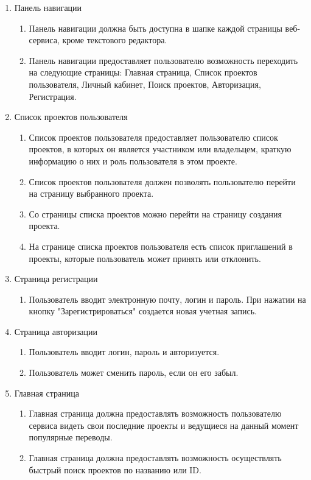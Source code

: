 \documentclass[a4paper,12pt]{article}
\begin{document}
\begin{enumerate}
\item Панель навигации
\begin{enumerate}
	\item Панель навигации должна быть доступна в шапке каждой страницы веб-сервиса, кроме текстового редактора.
	\item Панель навигации предоставляет пользователю возможность переходить на следующие страницы: Главная страница, Список проектов пользователя, Личный кабинет, Поиск проектов, Авторизация, Регистрация.
\end{enumerate}
\item Список проектов пользователя
\begin{enumerate}
	\item Список проектов пользователя предоставляет пользователю список проектов, в которых он является участником или владельцем, краткую информацию о них и роль пользователя в этом проекте.
	\item Список проектов пользователя должен позволять пользователю перейти на страницу выбранного проекта.
	\item Со страницы списка проектов можно перейти на страницу создания проекта.
	\item На странице списка проектов пользователя есть список приглашений в проекты, которые пользователь может принять или отклонить.
\end{enumerate}
\item Страница регистрации
\begin{enumerate}
	\item Пользователь вводит электронную почту, логин и пароль. При нажатии на кнопку "Зарегистрироваться" создается новая учетная запись.
\end{enumerate}
\item Страница авторизации
\begin{enumerate}
	\item Пользователь вводит логин, пароль и авторизуется.
	\item Пользователь может сменить пароль, если он его забыл.
\end{enumerate}
\item Главная страница
\begin{enumerate}
	\item Главная страница должна предоставлять возможность пользователю сервиса видеть свои последние проекты и ведущиеся на данный момент популярные переводы.
	\item Главная страница должна предоставлять возможность осуществлять быстрый поиск проектов по названию или ID.

\end{enumerate}
\end{enumerate}
\end{document}
